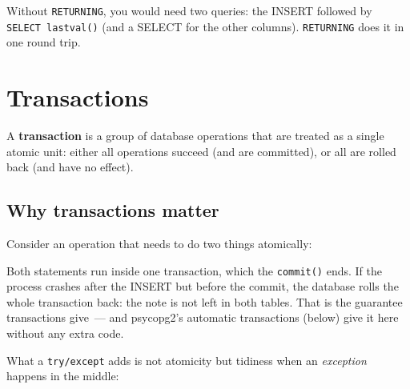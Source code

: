 \noindent{}Without \texttt{RETURNING}, you would need two queries: the INSERT followed by \texttt{SELECT\ lastval()} (and a SELECT for the other columns). \texttt{RETURNING} does it in one round trip.

\setcounter{section}{4}
\section{Transactions}\label{33-logic-execution:335-transactions}

A \textbf{transaction} is a group of database operations that are treated as a single atomic unit: either all operations succeed (and are committed), or all are rolled back (and have no effect).

\subsection*{Why transactions matter}\label{33-logic-execution:why-transactions-matter}

Consider an operation that needs to do two things atomically:

\begin{codebox}[short]

\begin{Shaded}
\begin{Highlighting}[]
\end{Highlighting}
\end{Shaded}

\end{codebox}

\noindent{}Both statements run inside one transaction, which the \texttt{commit()} ends. If the process crashes after the INSERT but before the commit, the database rolls the whole transaction back: the note is not left in both tables. That is the guarantee transactions give~--- and psycopg2's automatic transactions (below) give it here without any extra code.

What a \texttt{try/except} adds is not atomicity but tidiness when an \emph{exception} happens in the middle:

